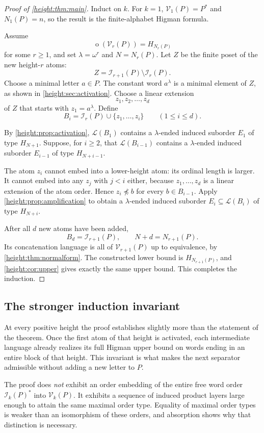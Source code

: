 \documentclass[11pt,a4paper]{article}
\numberwithin{equation}{section}
\theoremstyle{definition}
\theoremstyle{remark}
\newcommand{\mot}{\mathop{o}}
\newcommand{\Vheight}{\mathcal V}
\newcommand{\I}{\mathcal I}
\newcommand{\Lcal}{\mathcal L}
\newcommand{\nemb}{\npreccurlyeq}
\begin{document}
\begin{proof}[Proof of \cref{height:thm:main}]
Induct on $k$. For $k=1$, $\Vheight_1(P)=P^*$ and $N_1(P)=n$, so the result
is the finite-alphabet Higman formula.

Assume
\[
  \mot(\Vheight_r(P))=H_{N_r(P)}
\]
for some $r\ge1$, and set $\lambda=\omega^r$ and $N=N_r(P)$.
Let $Z$ be the finite poset of the new height-$r$ atoms:
\[
  Z=\I_{r+1}(P)\setminus\I_r(P).
\]
Choose a minimal letter $a\in P$. The constant word $a^\lambda$ is a
minimal element of $Z$, as shown in \cref{height:sec:activation}. Choose a linear
extension
\[
  z_1,z_2,\ldots,z_d
\]
of $Z$ that starts with $z_1=a^\lambda$.
Define
\[
  B_i=\I_r(P)\cup\{z_1,\ldots,z_i\}\qquad(1\le i\le d).
\]

By \cref{height:prop:activation}, $\Lcal(B_1)$ contains a $\lambda$-ended induced
suborder $E_1$ of type $H_{N+1}$. Suppose, for $i\ge2$, that
$\Lcal(B_{i-1})$ contains a $\lambda$-ended induced suborder $E_{i-1}$
of type $H_{N+i-1}$.

The atom $z_i$ cannot embed into a lower-height atom: its ordinal length
is larger. It cannot embed into any $z_j$ with $j<i$ either, because
$z_1,\ldots,z_d$ is a linear extension of the atom order. Hence
$z_i\nemb b$ for every $b\in B_{i-1}$.
Apply \cref{height:prop:amplification} to obtain a $\lambda$-ended induced
suborder $E_i\subseteq\Lcal(B_i)$ of type $H_{N+i}$.

After all $d$ new atoms have been added,
\[
  B_d=\I_{r+1}(P),\qquad N+d=N_{r+1}(P).
\]
Its concatenation language is all of $\Vheight_{r+1}(P)$ up to equivalence,
by \cref{height:thm:normalform}. The constructed lower bound is
$H_{N_{r+1}(P)}$, and \cref{height:cor:upper} gives exactly the same upper bound.
This completes the induction.
\end{proof}

\subsection{The stronger induction invariant}

At every positive height the proof establishes slightly more than the
statement of the theorem. Once the first atom of that height is activated,
each intermediate language already realizes its full Higman upper bound
on words ending in an entire block of that height. This invariant is
what makes the next separator admissible without adding a new letter to
$P$.

The proof does \emph{not} exhibit an order embedding of the entire free
word order $\I_k(P)^*$ into $\Vheight_k(P)$. It exhibits a sequence of induced
product layers large enough to attain the same maximal order type.
Equality of maximal order types is weaker than an isomorphism of these
orders, and absorption shows why that distinction is necessary.
\end{document}
